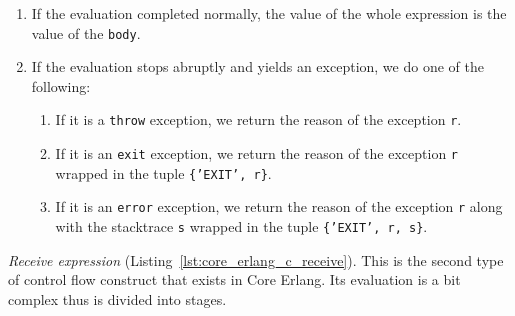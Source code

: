\begin{enumerate}
  \item If the evaluation completed normally, the value of the whole expression is the value of the \texttt{body}.
  \item If the evaluation stops abruptly and yields an exception, we do one of the following:
    \begin{enumerate}
      \item If it is a \texttt{throw} exception, we return the reason of the
        exception \texttt{r}.
      \item If it is an \texttt{exit} exception, we return the reason of the
        exception \texttt{r} wrapped in the tuple \texttt{\{'EXIT', r\}}.
      \item If it is an \texttt{error} exception, we return the reason of the
        exception \texttt{r} along with the stacktrace \texttt{s} wrapped in
        the tuple \texttt{\{'EXIT', r, s\}}.
    \end{enumerate}
\end{enumerate}


\emph{Receive expression} (Listing~\ref{lst:core_erlang_c_receive}).
This is the second type of control flow construct that exists in Core Erlang.
Its evaluation is a bit complex thus is divided into stages.

